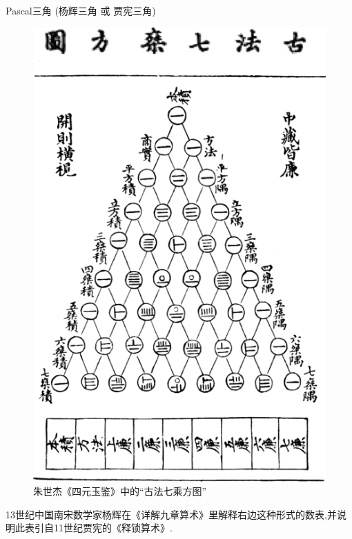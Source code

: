 \documentclass[punct]{ctexbeamer}
\begin{document}
\begin{frame}{Pascal三角  (杨辉三角 或 贾宪三角)}
\begin{center}
\begin{minipage}{0.5\linewidth}
\begin{table}[]
\begin{center}
        \end{center}
        \caption{Pascal三角}
    \end{table}
\end{minipage}
\hspace*{25pt}
\begin{minipage}{0.35\linewidth}
    \begin{figure}
        \centering
        \includegraphics[scale=0.21]{yanghui.png}
        \caption{朱世杰《四元玉鉴》中的“古法七乘方图''}
    \end{figure}
\end{minipage}
\end{center}






    13世纪中国南宋数学家杨辉在《详解九章算术》里解释右边这种形式的数表,并说明此表引自11世纪贾宪的《释锁算术》.



\end{frame}
\end{document}
